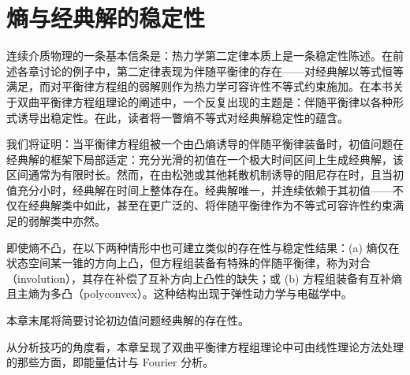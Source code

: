 \documentclass[../main.tex]{subfiles}
\begin{document}
\chapter{熵与经典解的稳定性}\label{chapter:ch05-熵与经典解稳定性}

连续介质物理的一条基本信条是：热力学第二定律本质上是一条稳定性陈述。在前述各章讨论的例子中，第二定律表现为伴随平衡律的存在——对经典解以等式恒等满足，而对平衡律方程组的弱解则作为热力学可容许性不等式约束施加。在本书关于双曲平衡律方程组理论的阐述中，一个反复出现的主题是：伴随平衡律以各种形式诱导出稳定性。在此，读者将一瞥熵不等式对经典解稳定性的蕴含。

我们将证明：当平衡律方程组被一个由凸熵诱导的伴随平衡律装备时，初值问题在经典解的框架下局部适定：充分光滑的初值在一个极大时间区间上生成经典解，该区间通常为有限时长。然而，在由松弛或其他耗散机制诱导的阻尼存在时，且当初值充分小时，经典解在时间上整体存在。经典解唯一，并连续依赖于其初值——不仅在经典解类中如此，甚至在更广泛的、将伴随平衡律作为不等式可容许性约束满足的弱解类中亦然。

即使熵不凸，在以下两种情形中也可建立类似的存在性与稳定性结果：(a) 熵仅在状态空间某一锥的方向上凸，但方程组装备有特殊的伴随平衡律，称为对合（involution），其存在补偿了互补方向上凸性的缺失；或 (b) 方程组装备有互补熵且主熵为多凸（polyconvex）。这种结构出现于弹性动力学与电磁学中。

本章末尾将简要讨论初边值问题经典解的存在性。

从分析技巧的角度看，本章呈现了双曲平衡律方程组理论中可由线性理论方法处理的那些方面，即能量估计与 Fourier 分析。














\end{document}
